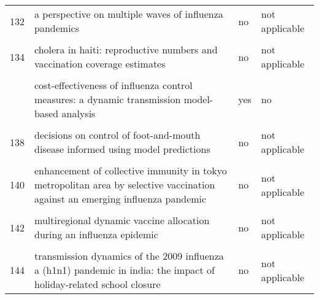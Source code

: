 \documentclass[
]{article}
\begin{document}
\begin{landscape}
\begin{longtable}{l>{\raggedright\arraybackslash}p{4cm}l>{\raggedright\arraybackslash}p{4cm}}
132 & a perspective on multiple waves of influenza pandemics & no & not applicable\\
\cellcolor{gray!6}{133} & \cellcolor{gray!6}{an optimal control problem arising from a dengue disease transmission model} & \cellcolor{gray!6}{no} & \cellcolor{gray!6}{not applicable}\\
134 & cholera in haiti: reproductive numbers and vaccination coverage estimates & no & not applicable\\
\cellcolor{gray!6}{135} & \cellcolor{gray!6}{comparing control strategies against foot-and-mouth disease: will vaccination be cost-effective in denmark?} & \cellcolor{gray!6}{yes} & \cellcolor{gray!6}{inconclusive}\\
\addlinespace
136 & cost-effectiveness of influenza control measures: a dynamic transmission model-based analysis & yes & no\\
\cellcolor{gray!6}{137} & \cellcolor{gray!6}{cost-effectiveness of workplace closure and travel restriction for mitigating influenza outbreaks: a network-based simulation} & \cellcolor{gray!6}{no} & \cellcolor{gray!6}{not applicable}\\
138 & decisions on control of foot-and-mouth disease informed using model predictions & no & not applicable\\
\cellcolor{gray!6}{139} & \cellcolor{gray!6}{dengue in cape verde: vector control and vaccination} & \cellcolor{gray!6}{no} & \cellcolor{gray!6}{not applicable}\\
140 & enhancement of collective immunity in tokyo metropolitan area by selective vaccination against an emerging influenza pandemic & no & not applicable\\
\addlinespace
\cellcolor{gray!6}{141} & \cellcolor{gray!6}{estimated impact of aggressive empirical antiviral treatment in containing an outbreak of pandemic influenza h1n1 in an isolated first nations community} & \cellcolor{gray!6}{no} & \cellcolor{gray!6}{not applicable}\\
142 & multiregional dynamic vaccine allocation during an influenza epidemic & no & not applicable\\
\cellcolor{gray!6}{143} & \cellcolor{gray!6}{policies to reduce influenza in the workplace: impact assessments using an agent-based model} & \cellcolor{gray!6}{no} & \cellcolor{gray!6}{not applicable}\\
144 & transmission dynamics of the 2009 influenza a (h1n1) pandemic in india: the impact of holiday-related school closure & no & not applicable\\

\end{longtable}
\end{landscape}
\end{document}
